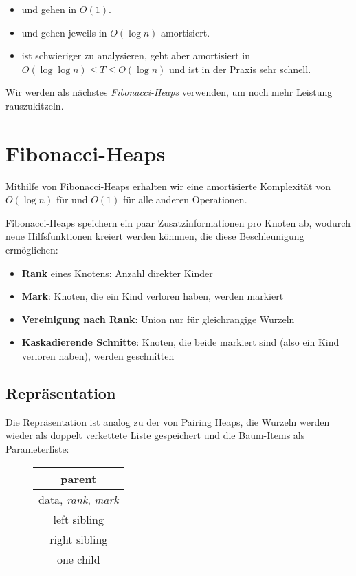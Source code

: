 \begin{itemize}
  \item {} und  gehen in \( O(1) \).
  \item {} und  gehen jeweils in \( O(\log n) \) amortisiert.
  \item {} ist schwieriger zu analysieren, geht aber amortisiert in \( O(\log\log n) \leq T \leq O(\log n) \) und ist in der Praxis sehr schnell.
\end{itemize}

Wir werden als nächstes \emph{Fibonacci-Heaps} verwenden, um noch mehr Leistung rauszukitzeln.

\section{Fibonacci-Heaps}

Mithilfe von Fibonacci-Heaps erhalten wir eine amortisierte Komplexität von \( O(\log n) \) für  und \( O(1) \) für alle anderen Operationen.

Fibonacci-Heaps speichern ein paar Zusatzinformationen pro Knoten ab, wodurch neue Hilfsfunktionen kreiert werden könnnen, die diese Beschleunigung ermöglichen:

\begin{itemize}
  \item \textbf{Rank} eines Knotens: Anzahl direkter Kinder
  \item \textbf{Mark}: Knoten, die ein Kind verloren haben, werden markiert
  \item \textbf{Vereinigung nach Rank}: Union nur für gleichrangige Wurzeln
  \item \textbf{Kaskadierende Schnitte}: Knoten, die beide markiert sind (also ein Kind verloren haben), werden geschnitten
\end{itemize}

\subsection{Repräsentation}

\begin{minipage}{.725\textwidth}
  Die Repräsentation ist analog zu der von Pairing Heaps, die Wurzeln werden wieder als doppelt verkettete Liste gespeichert und die Baum-Items als Parameterliste:
\end{minipage}
\hfill
\begin{minipage}{.25\textwidth}
  \begin{figure}[H]
    \begin{tabular}{| c |}
      \hline
      parent \\
      \hline
      data, \emph{rank}, \emph{mark} \\
      \hline
      left sibling \\
      \hline
      right sibling \\
      \hline
      one child \\
      \hline
    \end{tabular}
  \end{figure}
\end{minipage}

